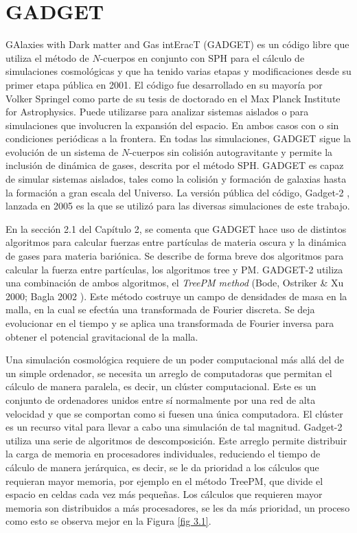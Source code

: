 \documentclass[a4paper,openright,10pt, oneside, final]{book}
\begin{document}
\chapter{GADGET}\label{GADGET}
GAlaxies with Dark matter and Gas intEracT (GADGET) es un código libre que utiliza el método de $N$-cuerpos en conjunto con SPH para el cálculo de simulaciones cosmológicas y que ha tenido varias etapas y modificaciones desde su primer etapa pública en 2001. El código fue desarrollado en su mayoría por Volker Springel \cite{b4} como parte de su tesis de doctorado en el Max Planck Institute for Astrophysics. Puede utilizarse para analizar sistemas aislados o para simulaciones que involucren la expansión del espacio. En ambos casos con o sin condiciones periódicas a la frontera. En todas las simulaciones, GADGET sigue la evolución de un sistema de $N$-cuerpos sin colisión autogravitante y permite la inclusión de dinámica de gases, descrita por el método SPH.
GADGET es capaz de simular sistemas aislados, tales como la colisión y formación de galaxias hasta la formación a gran escala del Universo. La versión pública del código, Gadget-2 \cite{b10}, lanzada en 2005 es la que se utilizó para las diversas simulaciones de este trabajo.

En la sección 2.1 del Capítulo 2, se comenta que GADGET hace uso de distintos algoritmos para calcular fuerzas entre partículas de materia oscura y la dinámica de gases para materia bariónica. Se describe de forma breve dos algoritmos para calcular la fuerza entre partículas, los algoritmos tree y PM. GADGET-2 utiliza una combinación de ambos algoritmos, el \textit{TreePM method} (Bode, Ostriker \& Xu 2000; Bagla 2002 \cite{3.0.1, 3.0.2}). Este método costruye un campo de densidades de masa en la malla, en la cual se efectúa una transformada de Fourier discreta. Se deja evolucionar en el tiempo y se aplica una transformada de Fourier inversa para obtener el potencial gravitacional de la malla.

Una simulación cosmológica requiere de un poder computacional más allá del de un simple ordenador, se necesita un arreglo de computadoras que permitan el cálculo de manera paralela, es decir, un clúster computacional. Este es un conjunto de ordenadores unidos entre sí normalmente por una red de alta velocidad y que se comportan como si fuesen una única computadora. El clúster es un recurso vital para llevar a cabo una simulación de tal magnitud. Gadget-2 utiliza una serie de algoritmos de descomposición. Este arreglo permite distribuir la carga de memoria en procesadores individuales, reduciendo el tiempo de cálculo de manera jerárquica, es decir, se le da prioridad a los cálculos que requieran mayor memoria, por ejemplo en el método TreePM, que divide el espacio en celdas cada vez más pequeñas. Los cálculos que requieren mayor memoria son distribuidos a más procesadores, se les da más prioridad, un proceso como esto se observa mejor en la Figura \ref{fig 3.1}.
\end{document}
